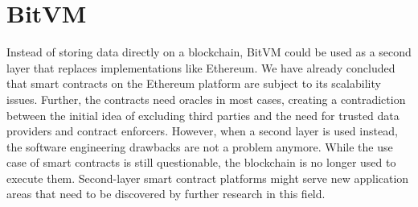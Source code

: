 \section{BitVM}
Instead of storing data directly on a blockchain, BitVM could be used as a second layer that replaces implementations like Ethereum.
We have already concluded that smart contracts on the Ethereum platform are subject to its scalability issues.
Further, the contracts need oracles in most cases, creating a contradiction between the initial idea of excluding third parties and the need for trusted data providers and contract enforcers.
However, when a second layer is used instead, the software engineering drawbacks are not a problem anymore.
While the use case of smart contracts is still questionable, the blockchain is no longer used to execute them.
Second-layer smart contract platforms might serve new application areas that need to be discovered by further research in this field.